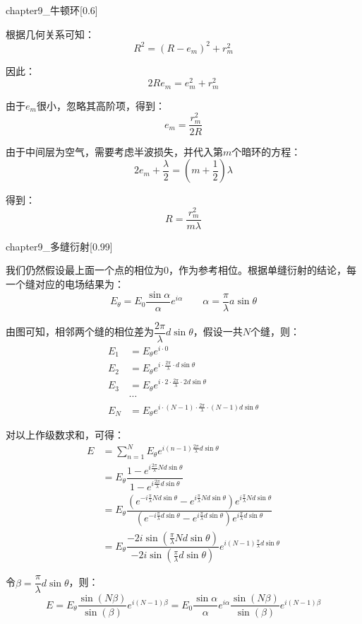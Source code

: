 \begin{prove}[牛顿环的曲率半径]
  \begin{singlefigure}[牛顿环]{chapter9_牛顿环}[0.6]
  \end{singlefigure}
  根据几何关系可知：
  \[R^2 = (R - e_m)^2 + r_m^2\]

  因此：
  \[2Re_m = e_m^2 + r_m^2\]

  由于$e_m$很小，忽略其高阶项，得到：
  \[e_m = \dfrac{r_m^2}{2R}\]

  由于中间层为空气，需要考虑半波损失，并代入第$m$个暗环的方程：
  \[2e_m + \dfrac{\lambda}{2} = (m + \dfrac{1}{2})\lambda\]

  得到：
  \[R = \dfrac{r_m^2}{m\lambda}\]
\end{prove}

\begin{prove}
  \begin{singlefigure}[多缝衍射]{chapter9_多缝衍射}[0.99]
  \end{singlefigure}

  我们仍然假设最上面一个点的相位为0，作为参考相位。根据单缝衍射的结论，每一个缝对应的电场结果为：
  \[E_{\theta} = E_0\dfrac{\sin\alpha}{\alpha}e^{i\alpha}\qquad \alpha = \dfrac{\pi}{\lambda}a\sin\theta\]

  由图可知，相邻两个缝的相位差为$\dfrac{2\pi}{\lambda}d\sin\theta$，假设一共$N$个缝，则：
  \begin{align*}
    E_1 &= E_{\theta} e^{i\cdot 0}\\
    E_2 &= E_{\theta} e^{i\cdot \frac{2\pi}{\lambda}\cdot d \sin \theta}\\
    E_3 &= E_{\theta} e^{i\cdot 2\cdot \frac{2\pi}{\lambda}\cdot 2d\sin \theta}\\
    &\cdots\\
    E_N &= E_{\theta} e^{i\cdot (N-1)\cdot \frac{2\pi}{\lambda}\cdot (N-1)d\sin \theta}
  \end{align*}

  对以上作级数求和，可得：
  \begin{align*}
    E &= \sum_{n=1}^{N}E_{\theta}e^{i(n-1)\frac{2\pi}{\lambda}d\sin\theta}\\
    &= E_{\theta}\dfrac{1-e^{i\frac{2\pi}{\lambda} Nd\sin\theta}}{1-e^{i\frac{2\pi}{\lambda} d\sin\theta}}\\
    &= E_{\theta}\dfrac{(e^{-i\frac{\pi}{\lambda} Nd\sin\theta}- e^{i\frac{\pi}{\lambda} Nd\sin\theta})e^{i\frac{\pi}{\lambda} Nd\sin\theta}}{(e^{-i\frac{\pi}{\lambda} d\sin\theta}-e^{i\frac{\pi}{\lambda} d\sin\theta})e^{i\frac{\pi}{\lambda} d\sin\theta}}\\
    &= E_{\theta}\dfrac{-2i\sin(\frac{\pi}{\lambda}Nd\sin\theta)}{-2i\sin(\frac{\pi}{\lambda}d\sin\theta)}e^{i(N-1)\frac{\pi}{\lambda}d\sin\theta}
  \end{align*}

  令$\beta = \dfrac{\pi}{\lambda}d\sin\theta$，则：
  \[E = E_{\theta}\dfrac{\sin(N\beta)}{\sin(\beta)}e^{i(N-1)\beta} = E_0\dfrac{\sin\alpha}{\alpha}e^{i\alpha}\dfrac{\sin(N\beta)}{\sin(\beta)}e^{i(N-1)\beta}\]
\end{prove}

